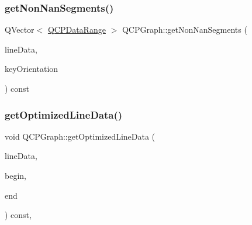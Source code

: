 \mbox{\label{class_q_c_p_graph_a0e0886b9ec7731d8993bbb104465f3b9}} 
\subsubsection{\texorpdfstring{getNonNanSegments()}{getNonNanSegments()}}
{\footnotesize\ttfamily Q\+Vector$<$ \mbox{\hyperlink{class_q_c_p_data_range}{Q\+C\+P\+Data\+Range}} $>$ Q\+C\+P\+Graph\+::get\+Non\+Nan\+Segments (\begin{DoxyParamCaption}\item[{const Q\+Vector$<$ Q\+PointF $>$ $\ast$}]{line\+Data,  }\item[{Qt\+::\+Orientation}]{key\+Orientation }\end{DoxyParamCaption}) const\hspace{0.3cm}{\ttfamily [protected]}}

\mbox{\label{class_q_c_p_graph_a1fed1c9d627d9d3b49a6206cc2e60fe1}} 
\subsubsection{\texorpdfstring{getOptimizedLineData()}{getOptimizedLineData()}}
{\footnotesize\ttfamily void Q\+C\+P\+Graph\+::get\+Optimized\+Line\+Data (\begin{DoxyParamCaption}\item[{Q\+Vector$<$ \mbox{\hyperlink{class_q_c_p_graph_data}{Q\+C\+P\+Graph\+Data}} $>$ $\ast$}]{line\+Data,  }\item[{const \mbox{\hyperlink{class_q_c_p_data_container_ae40a91f5cb0bcac61d727427449b7d15}{Q\+C\+P\+Graph\+Data\+Container\+::const\+\_\+iterator}} \&}]{begin,  }\item[{const \mbox{\hyperlink{class_q_c_p_data_container_ae40a91f5cb0bcac61d727427449b7d15}{Q\+C\+P\+Graph\+Data\+Container\+::const\+\_\+iterator}} \&}]{end }\end{DoxyParamCaption}) const\hspace{0.3cm}{\ttfamily [protected]}, {\ttfamily [virtual]}}

\mbox{\label{class_q_c_p_graph_a5423245898537e375b9364cf26e89aea}} 
